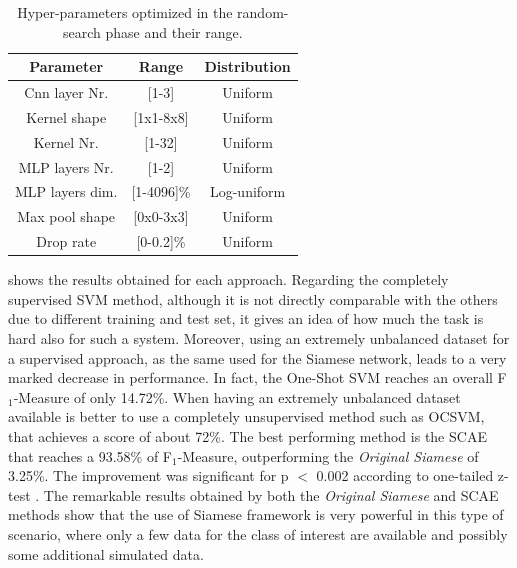 \begin{table}[t]
	\caption{Hyper-parameters optimized in the random-search phase and their range.}
	\label{tbl:hyper-params_few_shot}
	\centering
	\footnotesize
	\begin{tabular} {|c | c | c|}
		\hline
		Parameter 		& Range & Distribution \\  
		\hline\hline
		Cnn layer Nr. 	& [1-3]& Uniform \\
		\hline
		Kernel shape 	& [1x1-8x8]& Uniform  \\
		\hline									
		Kernel Nr. 		& [1-32]& Uniform \\
		\hline                                     
		MLP layers Nr. 	&	[1-2]& Uniform \\
		\hline
		MLP layers dim.	&[1-4096]\% & Log-uniform \\
		\hline
		Max pool shape & [0x0-3x3] & Uniform\\
		\hline
		Drop rate &	[0-0.2]\% & Uniform	 \\
		\hline
	\end{tabular}
\end{table}																													
 shows the results obtained for each approach. Regarding the completely supervised SVM method, although it is not directly comparable with the others due to different training and test set, it gives an idea of how much the task is hard also for such a system. Moreover, using an extremely unbalanced dataset for a supervised approach, as the same used for the Siamese network, leads to a very marked decrease in performance. In fact, the One-Shot SVM reaches an overall F$_1$-Measure of only 14.72\%. When having an extremely unbalanced dataset available is better to use a completely unsupervised method such as OCSVM, that achieves a score of about 72\%. 
The best performing method is the SCAE that reaches a 93.58\% of F$_1$-Measure, outperforming the \textit{Original Siamese} of 3.25\%. The improvement was significant for p $<$ 0.002 according to one-tailed z-test \cite{smucker2007comparison}. The remarkable results obtained by both the \textit{Original Siamese} and SCAE methods show that the use of Siamese framework is very powerful in this type of scenario, where only a few data for the class of interest are available and possibly some additional simulated data.
